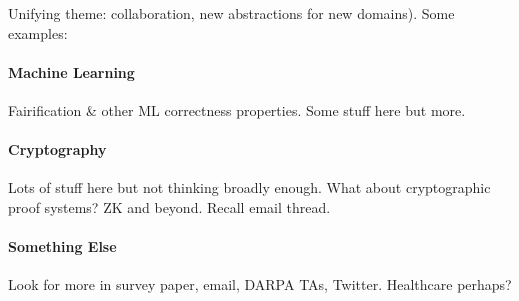 Unifying theme: collaboration, new abstractions for new domains). Some examples:

\paragraph{Machine Learning} Fairification \& other ML correctness properties. Some stuff here but more.

\paragraph{Cryptography} Lots of stuff here but not thinking broadly enough. What about cryptographic proof systems? ZK and beyond. Recall email thread.

\paragraph{Something Else} Look for more in survey paper, email, DARPA TAs, Twitter. Healthcare perhaps? %
